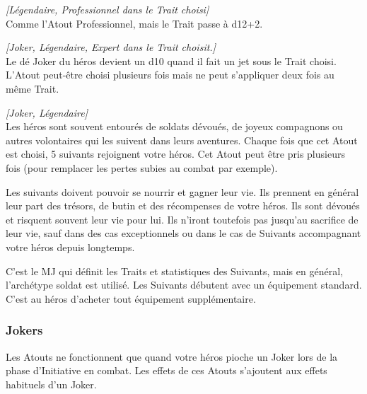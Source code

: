 \begin{description}[align=left]
    \item [Expert]
        \label{sec:atout-expert}
        \emph{[Légendaire, Professionnel dans le Trait choisi]}\\
        Comme l’Atout Professionnel, mais le Trait passe à d12+2.

    \item [Maître]
        \emph{[Joker, Légendaire, Expert dans le Trait choisit.]}\\
        Le dé Joker du héros devient un d10 quand il fait un jet sous le Trait choisi. L’Atout peut-être choisi plusieurs fois mais ne peut s’appliquer deux fois au même Trait.

    \item [Suivants]
        \emph{[Joker, Légendaire]}\\
        Les héros sont souvent entourés de soldats dévoués, de joyeux compagnons ou autres volontaires qui les suivent dans leurs aventures. Chaque fois que cet Atout est choisi, 5 suivants rejoignent votre héros. Cet Atout peut être pris plusieurs fois (pour remplacer les pertes subies au combat par exemple). 

        Les suivants doivent pouvoir se nourrir et gagner leur vie. Ils prennent en général leur part des trésors, de butin et des récompenses de votre héros. Ils sont dévoués et risquent souvent leur vie pour lui. Ils n’iront toutefois pas jusqu’au sacrifice de leur vie, sauf dans des cas exceptionnels ou dans le cas de Suivants accompagnant votre héros depuis longtemps. 

        C’est le MJ qui définit les Traits et statistiques des Suivants, mais en général, l’archétype soldat est utilisé. Les Suivants débutent avec un équipement standard. C’est au héros d’acheter tout équipement supplémentaire.

\end{description}


\subsubsection{Jokers}

Les Atouts ne fonctionnent que quand votre héros pioche un Joker lors de la phase d’Initiative en combat. Les effets de ces Atouts s’ajoutent aux effets habituels d’un Joker.


